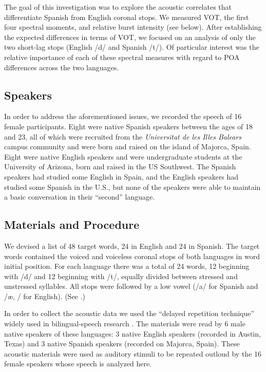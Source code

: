 \documentclass[a4paper,11pt,twocolumn]{article}
\begin{document}
The goal of this investigation was to explore the acoustic correlates that differentiate Spanish from English coronal stops. We measured VOT, the first four spectral moments, and relative burst intensity (see below). After establishing the expected differences in terms of VOT, we focused on an analysis of only the two short-lag stops (English /d/ and Spanish /t/). Of particular interest was the relative importance of each of these spectral measures with regard to POA differences across the two languages.

\subsection{Speakers}
  
In order to address the aforementioned issues, we recorded the speech of 16 female participants. Eight were native Spanish speakers between the ages of 18 and 23, all of which were recruited from the \textit{Universitat de les Illes Balears} campus community and were born and raised on the island of Majorca, Spain. Eight were native English speakers and were undergraduate students at the University of Arizona, born and raised in the US Southwest. The Spanish speakers had studied some English in Spain, and the English speakers had studied some Spanish in the U.S., but none of the speakers were able to maintain a basic conversation in their ``second'' language.

\subsection{Materials and Procedure}

We devised a list of 48 target words, 24 in English and 24 in Spanish. The target words contained the voiced and voiceless coronal stops of both languages in word initial position. For each language there was a total of 24 words, 12 beginning with /d/ and 12 beginning with /t/, equally divided between stressed and unstressed syllables. All stops were followed by a low vowel (/a/ for Spanish and /\ae, \textscripta/ for English). (See \cite{sundara2005acoustic}.)

In order to collect the acoustic data we used the ``delayed repetition technique'' widely used in bilingual-speech research \cite{flege1995}. The materials were read by 6 male native speakers of these languages: 3 native English speakers (recorded in Austin, Texas) and 3 native Spanish speakers (recorded on Majorca, Spain). These acoustic materials were used as auditory stimuli to be repeated outloud by the 16 female speakers whose speech is analyzed here.
\end{document}
